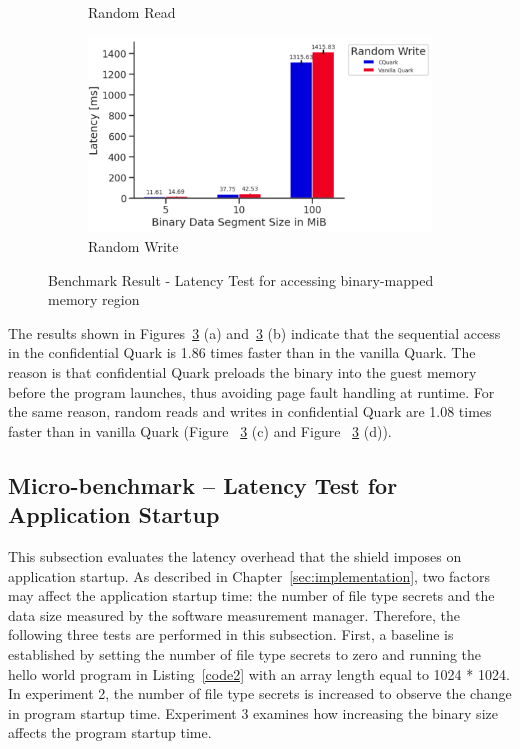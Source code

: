 \begin{figure}[!htb]
\begin{subfigure}[b]{0.5\linewidth}
      \caption{Random Read} 
      \label{fig7:c} 
    \end{subfigure}%
    \begin{subfigure}[b]{0.5\linewidth}
      \centering
      \includegraphics[width=0.9\linewidth]{images/Random_Write.PNG} 
      \caption{Random Write} 
      \label{fig7:d} 
    \end{subfigure} 
    \caption{Benchmark Result - Latency Test for accessing binary-mapped memory region}
    \label{fig7} 
\end{figure}



The results shown in Figures~\ref{fig7} (a) and~\ref{fig7} (b) indicate that the sequential access in the confidential Quark is 1.86 times faster than in the vanilla Quark. The reason is that confidential Quark preloads the binary into the guest memory before the program launches, thus avoiding page 
fault handling at runtime. For the same reason, random reads and writes in confidential Quark are 1.08 times faster than in vanilla Quark (Figure ~\ref{fig7} (c) and Figure ~\ref{fig7} (d)).


\subsection{Micro-benchmark – Latency Test for Application Startup}\label{micro_app_start_up}

This subsection evaluates the latency overhead that the shield imposes on application startup. As described in Chapter~\ref{sec:implementation}, two factors may affect the application startup time: the number of file type secrets and the data size measured by the software measurement manager. Therefore, 
the following three tests are performed in this subsection. First, a baseline is established by setting the number of file type secrets to zero and running the hello world program in Listing~\ref{code2} with an array length equal to 1024 * 1024. 
In experiment 2, the number of file type secrets is increased to observe the change in program startup time. Experiment 3 examines how increasing the binary size affects the program startup time.


